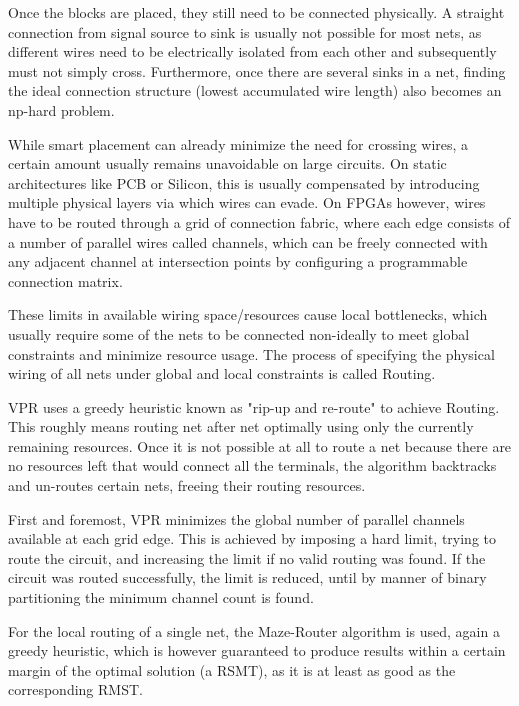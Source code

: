 Once the blocks are placed, they still need to be connected physically. A straight connection from signal source to sink is usually not possible for most nets, as different wires need to be electrically isolated from each other and subsequently must not simply cross. Furthermore, once there are several sinks in a net, finding the ideal connection structure (lowest accumulated wire length) also becomes an np-hard problem\cite{rsmt-complexity}.

While smart placement can already minimize the need for crossing wires, a certain amount usually remains unavoidable on large circuits. On static architectures like \gls{PCB} or Silicon, this is usually compensated by introducing multiple physical layers via which wires can evade. On \glspl{FPGA} however, wires have to be routed through a grid of connection fabric, where each edge consists of a number of parallel wires called channels, which can be freely connected with any adjacent channel at intersection points by configuring a programmable connection matrix.

These limits in available wiring space/resources cause local bottlenecks, which usually require some of the nets to be connected non-ideally to meet global constraints and minimize resource usage. The process of specifying the physical wiring of all nets under global and local constraints is called Routing.

\pagebreak

\gls{VPR} uses a greedy heuristic known as "rip-up and re-route" to achieve Routing. This roughly means routing net after net optimally using only the currently remaining resources. Once it is not possible at all to route a net because there are no resources left that would connect all the terminals, the algorithm backtracks and un-routes certain nets, freeing their routing resources\cite{vtr8}.

First and foremost, \gls{VPR} minimizes the global number of parallel channels available at each grid edge. This is achieved by imposing a hard limit, trying to route the circuit, and increasing the limit if no valid routing was found. If the circuit was routed successfully, the limit is reduced, until by manner of binary partitioning the minimum channel count is found.

For the local routing of a single net, the Maze-Router\cite{Maze-Router} algorithm is used, again a greedy heuristic, which is however guaranteed to produce results within a certain margin of the optimal solution (a \gls{RSMT}), as it is at least as good as the corresponding \gls{RMST}\cite{rmst-quality}.

